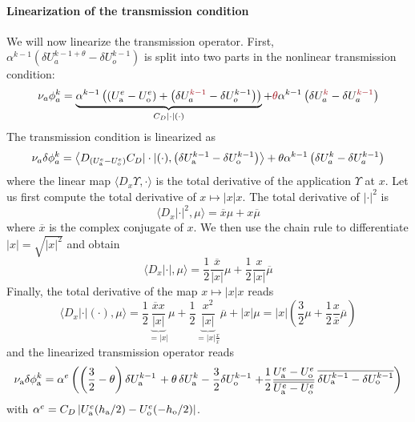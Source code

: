 \paragraph{Linearization of the transmission condition}
We will now linearize the transmission operator.
First, $\alpha^{k-1} \left(\delta U_a^{k-1+\theta}
- \delta U_o^{k-1}\right)$
is split into two parts in the nonlinear transmission condition:
\begin{equation}
	\nu_a \phi_a^k =
	\underbrace{
	\alpha^{k-1} \left(\left(U^e_{\rm a} - U^e_{\rm o}\right) +
	\left(\delta U_a^{\emphase{k-1}}
	- \delta U_o^{k-1}\right)\right)}_{C_D|\cdot|(\cdot)}
	+ \emphase{\theta} \alpha^{k-1}
	\left(\delta U_a^{\emphase{k}} - \delta U_a^{\emphase{k-1}}
	\right)
\end{equation}
The transmission condition is linearized as
\begin{equation}
	\nu_a \delta \phi_a^k = \left\langle
	D_{\left(U_{\rm a}^e - U_{\rm o}^e\right)}
	C_D |\cdot|(\cdot),
	\left(\delta U_{\rm a}^{k-1} -
	\delta U_{\rm o}^{k-1}
	\right)
	\right\rangle
	+ \theta \alpha^{k-1}
	\left(\delta U_a^{k} - \delta U_a^{k-1}
	\right)
\end{equation}
where the linear map $\langle D_x \Upsilon, \cdot \rangle$
is the total derivative of the application $\Upsilon$ at $x$.
Let us first compute the total derivative of $x\mapsto |x|x$.
The total derivative of $|\cdot|^2$ is
\begin{equation}
\langle D_x |\cdot|^2, \mu \rangle
= \overline{x} \mu + x \overline{\mu}
\end{equation}
where $\overline{x}$ is the complex conjugate of $x$.
We then use the chain rule to differentiate $|x| = \sqrt{|x|^2}$ and
obtain
\begin{equation}
\langle D_x |\cdot|, \mu \rangle =
\frac{1}{2} \frac{\overline{x}}{|x|} \mu
+ \frac{1}{2} \frac{x}{|x|} \overline{\mu}
\end{equation}
Finally, the total derivative of the map $x\mapsto |x|x$ reads
\begin{equation}
	\langle D_x |\cdot|(\cdot), \mu \rangle =
	\frac{1}{2} \underbrace{\frac{\overline{x}x}{|x|}}_{=|x|} \mu
	+ \frac{1}{2}
	\underbrace{\frac{x^2}{|x|}}_{=|x|\frac{x}{\overline{x}}}
	\overline{\mu}
	+ |x|\mu
	= |x| \left(\frac{3}{2}\mu + \frac{1}{2}\frac{x}{\overline{x}}
	\overline{\mu}\right)
\end{equation}
and the linearized transmission operator reads
\begin{equation}
\label{eq:linearised}
\begin{aligned}
\nu_{\rm a}\delta\phi_{\rm a}^k = \alpha^e 
\left( \left(\frac{3}{2} - \theta \right)\delta U_{\rm a}^{k-1} \right.
+ \theta\, \delta U_{\rm a}^{k}
- \frac{3}{2} \delta U_{\rm o}^{k-1}
\left.+ \frac{1}{2}\frac{U_{\rm a}^{{\color{black} e}} - U_{\rm o}^{{\color{black} e}}}
	{\overline{U_{\rm a}^{{\color{black} e}} - U_{\rm o}^{{\color{black} e}}}}\,
\overline{
\delta U_{\rm a}^{k-1} - \delta U_{\rm o}^{k-1}}
\right)
\end{aligned}
\end{equation}
with $\alpha^e=C_D\left|U_{\rm a}^e(h_{\rm a}/2) - U_{\rm o}^e(-h_{\rm o}/2)\right|$.
